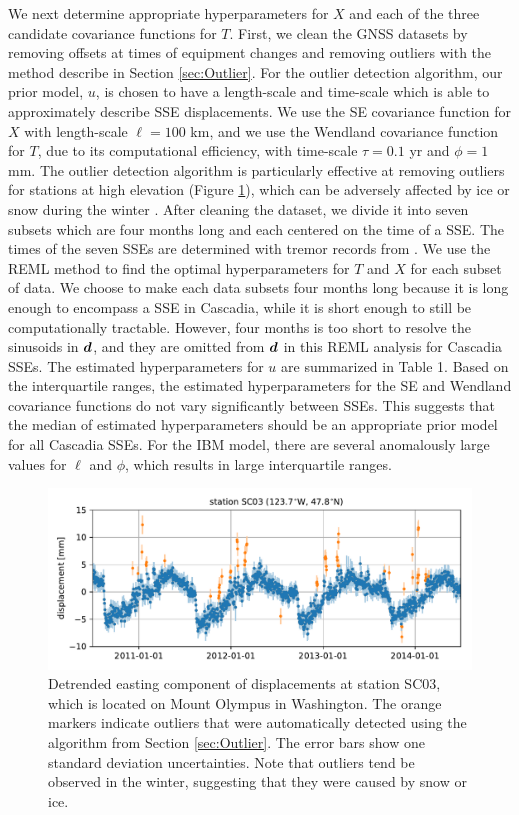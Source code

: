 \documentclass[extra,mreferee]{gji}
\begin{document}
We next determine appropriate hyperparameters for $X$ and each of the three candidate covariance functions for $T$. First, we clean the GNSS datasets by removing offsets at times of equipment changes and removing outliers with the method describe in Section \ref{sec:Outlier}. For the outlier detection algorithm, our prior model, $u$, is chosen to have a length-scale and time-scale which is able to approximately describe SSE displacements. We use the SE covariance function for $X$ with length-scale $\ell = 100$ km, and we use the Wendland covariance function for $T$, due to its computational efficiency, with time-scale $\tau = 0.1$ yr and $\phi = 1$ mm.  The outlier detection algorithm is particularly effective at removing outliers for stations at high elevation (Figure \ref{fig:Outliers}), which can be adversely affected by ice or snow during the winter \citep{Lisowski2008}. After cleaning the dataset, we divide it into seven subsets which are four months long and each centered on the time of a SSE. The times of the seven SSEs are determined with tremor records from \cite{Wech2010}. We use the REML method to find the optimal hyperparameters for $T$ and $X$ for each subset of data. We choose to make each data subsets four months long because it is long enough to encompass a SSE in Cascadia, while it is short enough to still be computationally tractable. However, four months is too short to resolve the sinusoids in $\mitbf{d}$, and they are omitted from $\mitbf{d}$ in this REML analysis for Cascadia SSEs. The estimated hyperparameters for $u$ are summarized in Table 1. Based on the interquartile ranges, the estimated hyperparameters for the SE and Wendland covariance functions do not vary significantly between SSEs. This suggests that the median of estimated hyperparameters should be an appropriate prior model for all Cascadia SSEs. For the IBM model, there are several anomalously large values for $\ell$ and $\phi$, which results in large interquartile ranges.   

\begin{figure}
\includegraphics{figures/outliers/outliers.pdf}
\caption{Detrended easting component of displacements at station SC03, which is located on Mount Olympus in Washington. The orange markers indicate outliers that were automatically detected using the algorithm from Section \ref{sec:Outlier}. The error bars show one standard deviation uncertainties. Note that outliers tend be observed in the winter, suggesting that they were caused by snow or ice.}   
\label{fig:Outliers}
\end{figure}
\end{document}
